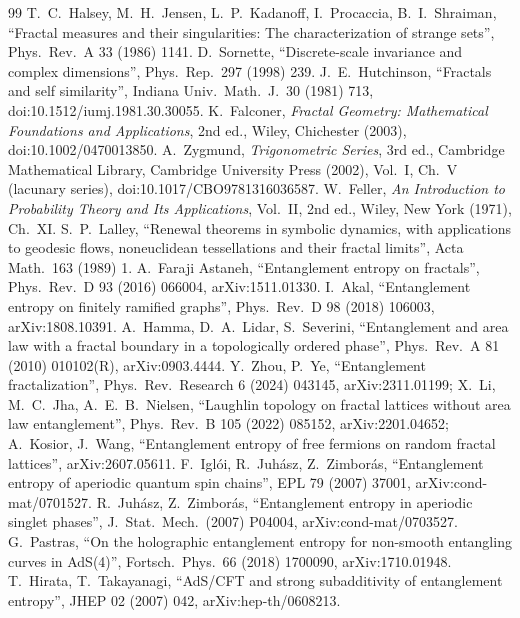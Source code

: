 \documentclass[11pt]{article}
\theoremstyle{definition}\newtheorem{definition}{Definition}[section]
\theoremstyle{remark}\newtheorem*{remark}{Remark}
\begin{document}
\begin{thebibliography}{99}
 T.~C.~Halsey, M.~H.~Jensen, L.~P.~Kadanoff, I.~Procaccia, B.~I.~Shraiman, ``Fractal measures and their singularities: The characterization of strange sets'', Phys.\ Rev.\ A 33 (1986) 1141.
 D.~Sornette, ``Discrete-scale invariance and complex dimensions'', Phys.\ Rep.\ 297 (1998) 239.
 J.~E.~Hutchinson, ``Fractals and self similarity'', Indiana Univ.\ Math.\ J.\ 30 (1981) 713, doi:10.1512/iumj.1981.30.30055.
 K.~Falconer, \emph{Fractal Geometry: Mathematical Foundations and Applications}, 2nd ed., Wiley, Chichester (2003), doi:10.1002/0470013850.
 A.~Zygmund, \emph{Trigonometric Series}, 3rd ed., Cambridge Mathematical Library, Cambridge University Press (2002), Vol.~I, Ch.~V (lacunary series), doi:10.1017/CBO9781316036587.
 W.~Feller, \emph{An Introduction to Probability Theory and Its Applications}, Vol.~II, 2nd ed., Wiley, New York (1971), Ch.~XI.
 S.~P.~Lalley, ``Renewal theorems in symbolic dynamics, with applications to geodesic flows, noneuclidean tessellations and their fractal limits'', Acta Math.\ 163 (1989) 1.
 A.~Faraji Astaneh, ``Entanglement entropy on fractals'', Phys.\ Rev.\ D 93 (2016) 066004, arXiv:1511.01330.
 I.~Akal, ``Entanglement entropy on finitely ramified graphs'', Phys.\ Rev.\ D 98 (2018) 106003, arXiv:1808.10391.
 A.~Hamma, D.~A.~Lidar, S.~Severini, ``Entanglement and area law with a fractal boundary in a topologically ordered phase'', Phys.\ Rev.\ A 81 (2010) 010102(R), arXiv:0903.4444.
 Y.~Zhou, P.~Ye, ``Entanglement fractalization'', Phys.\ Rev.\ Research 6 (2024) 043145, arXiv:2311.01199;
X.~Li, M.~C.~Jha, A.~E.~B.~Nielsen, ``Laughlin topology on fractal lattices without area law entanglement'', Phys.\ Rev.\ B 105 (2022) 085152, arXiv:2201.04652;
A.~Kosior, J.~Wang, ``Entanglement entropy of free fermions on random fractal lattices'', arXiv:2607.05611.
 F.~Igl\'oi, R.~Juh\'asz, Z.~Zimbor\'as, ``Entanglement entropy of aperiodic quantum spin chains'', EPL 79 (2007) 37001, arXiv:cond-mat/0701527.
 R.~Juh\'asz, Z.~Zimbor\'as, ``Entanglement entropy in aperiodic singlet phases'', J.\ Stat.\ Mech.\ (2007) P04004, arXiv:cond-mat/0703527.
 G.~Pastras, ``On the holographic entanglement entropy for non-smooth entangling curves in AdS(4)'', Fortsch.\ Phys.\ 66 (2018) 1700090, arXiv:1710.01948.
 T.~Hirata, T.~Takayanagi, ``AdS/CFT and strong subadditivity of entanglement entropy'', JHEP 02 (2007) 042, arXiv:hep-th/0608213.

\end{thebibliography}
\end{document}
